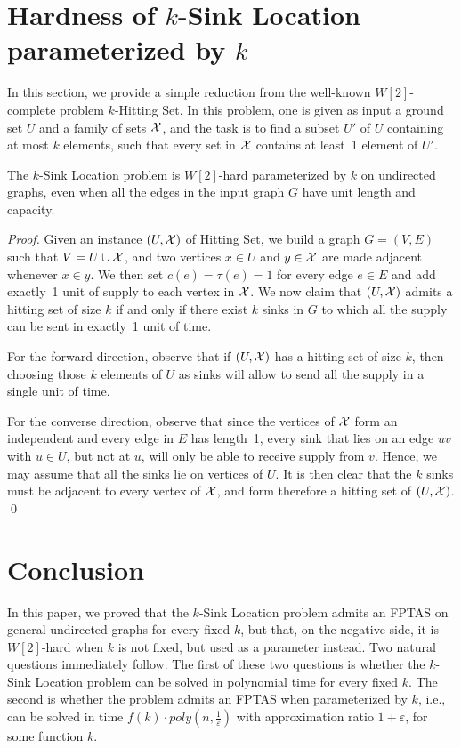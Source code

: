\documentclass[a4paper,10pt]{llncs}
\begin{document}
\section{Hardness of $k$-{\sc Sink Location} parameterized by $k$}

In this section, we provide a simple reduction from the well-known $W[2]$-complete problem $k$-{\sc Hitting Set}. In this problem, one is given as input a ground set $U$ and a family of sets ${\cal X}$, and the task is to find a subset $U'$ of $U$ containing at most $k$ elements, such that every set in ${\cal X}$ contains at least~1 element of $U'$.

\begin{theorem}
The $k$-{\sc Sink Location} problem is $W[2]$-hard parameterized by $k$ on undirected graphs, even when all the edges in the input graph $G$ have unit length and capacity.
\end{theorem}

\begin{proof}
Given an instance $(U,{\cal X})$ of {\sc Hitting Set}, we build a graph $G=(V,E)$ such that $V=U\cup{\cal X}$, and two vertices $x\in U$ and $y\in{\cal X}$ are made adjacent whenever  $x\in y$. We then set $c(e)=\tau(e)=1$ for every edge $e\in E$ and add exactly~1 unit of supply to each vertex in ${\cal X}$. We now claim that $(U,{\cal X})$ admits a hitting set of size $k$ if and only if there exist $k$ sinks in $G$ to which all the supply can be sent in exactly~1 unit of time.

For the forward direction, observe that if $(U,{\cal X})$ has a hitting set of size $k$, then choosing those $k$ elements of $U$ as sinks will allow to send all the supply in a single unit of time.

For the converse direction, observe that since the vertices of ${\cal X}$ form an independent and every edge in $E$ has length~1, every sink that lies on an edge $uv$ with $u\in U$, but not at $u$, will only be able to receive supply from $v$. Hence, we may assume that all the sinks lie on vertices of $U$. It is then clear that the $k$ sinks must be adjacent to every vertex of ${\cal X}$, and form therefore a hitting set of $(U,{\cal X})$. 
\qed
\end{proof}

\section{Conclusion}

In this paper, we proved that the $k$-{\sc Sink Location} problem admits an FPTAS on general undirected graphs for every fixed $k$, but that, on the negative side, it is $W[2]$-hard when $k$ is not fixed, but used as a parameter instead. Two natural questions immediately follow. The first of these two questions is whether the $k$-{\sc Sink Location} problem can be solved in polynomial time for every fixed $k$. The second is whether the problem admits an FPTAS when parameterized by $k$, i.e., can be solved in time $f(k)\cdot poly(n,\frac{1}{\varepsilon})$ with approximation ratio $1+\varepsilon$, for some function $k$.
\end{document}

